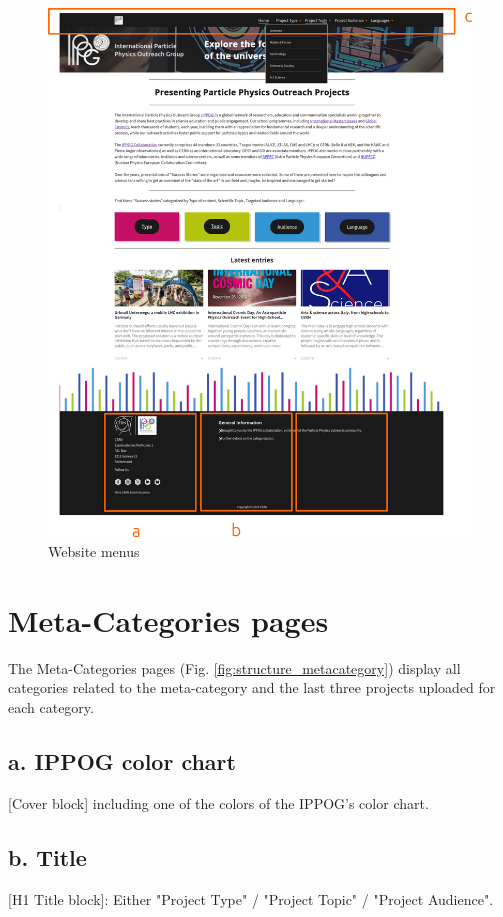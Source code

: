\begin{figure}[p]
    \centering
    \includegraphics[width=\linewidth]{Image/Architecture/menus.png}
    \caption{Website menus}
    \label{fig:menus}
\end{figure}

\newpage
\section{Meta-Categories pages}\label{sec:structure_metacategories}

The Meta-Categories pages (Fig. \ref{fig:structure_metacategory}) display all categories related to the meta-category and the last three projects uploaded for each category.

\subsection*{a. IPPOG color chart}
[Cover block] including one of the colors of the IPPOG's color chart.

\subsection*{b. Title}
[H1 Title block]: Either "Project Type" / "Project Topic" / "Project Audience".


